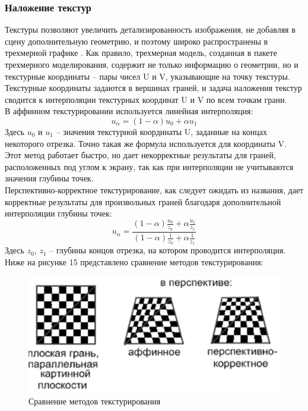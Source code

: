 \documentclass[a4paper, 10pt]{article}
\begin{document}
 	\subsubsection{Наложение текстур}
 	\hspace*{5mm}Текстуры позволяют увеличить детализированность изображения, не добавляя в сцену дополнительную геометрию, и поэтому широко распространены в трехмерной графике .
 	Как правило, трехмерная модель, созданная в пакете трехмерного моделирования, содержит не только информацию о геометрии, но и текстурные координаты – пары чисел U и V, указывающие на точку текстуры. Текстурные координаты задаются в вершинах граней, и задача наложения текстур сводится к интерполяции текстурных координат U и V по всем точкам грани.
 	\\В аффинном текстурировании используется линейная интерполяция:
 	\begin{equation}
 		u_\alpha = (1 - \alpha)u_0 + \alpha u_1
 	\end{equation}
 	\hspace*{5mm} Здесь $u_0$ и $u_1$ – значения текстурной координаты U, заданные на концах некоторого отрезка. Точно такая же формула используется для координаты V.
 	Этот метод работает быстро, но дает некорректные результаты для граней, расположенных под углом к экрану, так как при интерполяции не учитываются значения глубины точек.
 	\\ \hspace*{5mm} Перспективно-корректное текстурирование, как следует ожидать из названия, дает корректные результаты для произвольных граней благодаря дополнительной интерполяции глубины точек:
 	\begin{equation}
 		u_\alpha = \frac{(1-\alpha)\frac{u_0}{z_0} + \alpha\frac{u_1}{z_1}}{(1-\alpha)\frac{1}{z_0} + \alpha\frac{1}{z_1}}
 	\end{equation}
 	\hspace*{5mm} Здесь $z_0$, $z_1$ – глубины концов отрезка, на котором проводится интерполяция. Ниже на рисунке 15 представлено сравнение методов текстурирования:
 	\begin{figure}[h!]
 		\centering
 		\includegraphics[scale=0.7]{tekstr}
 		\centering\caption{Сравнение методов текстурирования}
 	\end{figure}
\end{document}
